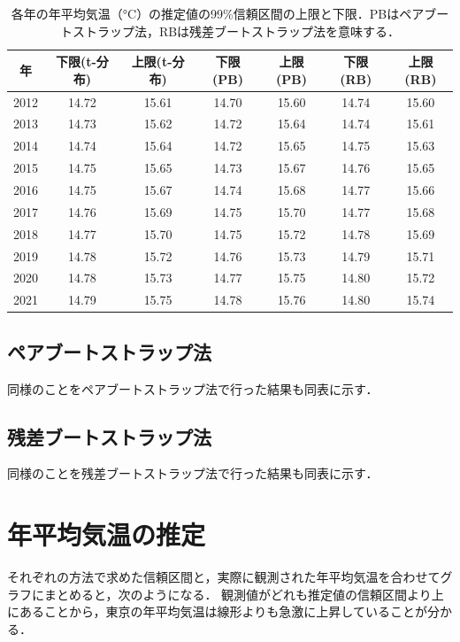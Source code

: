 \documentclass[a4paper,11pt]{jsarticle}
\begin{document}
\begin{table}[htbp]
  \centering
  \caption{各年の年平均気温（$\si{\degreeCelsius}$）の推定値の99\%信頼区間の上限と下限．PBはペアブートストラップ法，RBは残差ブートストラップ法を意味する．}
  \label{tab:99}
  \begin{tabular}{c|cccccc}
    年 & 下限(t-分布) & 上限(t-分布) & 下限(PB) & 上限(PB) & 下限(RB) & 上限(RB)\\
    \hline\hline
    2012 & 14.72 & 15.61 & 14.70 & 15.60 & 14.74 & 15.60\\
    2013 & 14.73 & 15.62 & 14.72 & 15.64 & 14.74 & 15.61\\
    2014 & 14.74 & 15.64 & 14.72 & 15.65 & 14.75 & 15.63\\
    2015 & 14.75 & 15.65 & 14.73 & 15.67 & 14.76 & 15.65\\
    2016 & 14.75 & 15.67 & 14.74 & 15.68 & 14.77 & 15.66\\
    2017 & 14.76 & 15.69 & 14.75 & 15.70 & 14.77 & 15.68\\
    2018 & 14.77 & 15.70 & 14.75 & 15.72 & 14.78 & 15.69\\
    2019 & 14.78 & 15.72 & 14.76 & 15.73 & 14.79 & 15.71\\
    2020 & 14.78 & 15.73 & 14.77 & 15.75 & 14.80 & 15.72\\
    2021 & 14.79 & 15.75 & 14.78 & 15.76 & 14.80 & 15.74\\
    \hline
  \end{tabular}
\end{table}

\subsection{ペアブートストラップ法}
同様のことをペアブートストラップ法で行った結果も同表に示す．

\subsection{残差ブートストラップ法}
同様のことを残差ブートストラップ法で行った結果も同表に示す．

\section{年平均気温の推定}
それぞれの方法で求めた信頼区間と，実際に観測された年平均気温を合わせてグラフにまとめると，次のようになる．
観測値がどれも推定値の信頼区間より上にあることから，東京の年平均気温は線形よりも急激に上昇していることが分かる．
\end{document}

